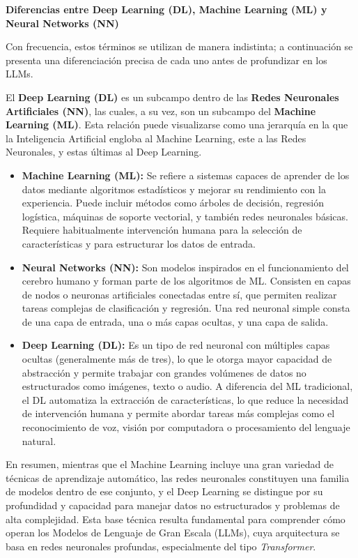 \newpage
\textbf{Diferencias entre Deep Learning (DL), Machine Learning (ML) y Neural Networks (NN)}

Con frecuencia, estos términos se utilizan de manera indistinta; a continuación se presenta una diferenciación precisa de cada uno antes de profundizar en los LLMs.

El \textbf{Deep Learning (DL)} es un subcampo dentro de las \textbf{Redes Neuronales Artificiales (NN)}, las cuales, a su vez, son un subcampo del \textbf{Machine Learning (ML)}. Esta relación puede visualizarse como una jerarquía en la que la Inteligencia Artificial engloba al Machine Learning, este a las Redes Neuronales, y estas últimas al Deep Learning.

\begin{itemize}
    \item \textbf{Machine Learning (ML):} Se refiere a sistemas capaces de aprender de los datos mediante algoritmos estadísticos y mejorar su rendimiento con la experiencia. Puede incluir métodos como árboles de decisión, regresión logística, máquinas de soporte vectorial, y también redes neuronales básicas. Requiere habitualmente intervención humana para la selección de características y para estructurar los datos de entrada.
    
    \item \textbf{Neural Networks (NN):} Son modelos inspirados en el funcionamiento del cerebro humano y forman parte de los algoritmos de ML. Consisten en capas de nodos o neuronas artificiales conectadas entre sí, que permiten realizar tareas complejas de clasificación y regresión. Una red neuronal simple consta de una capa de entrada, una o más capas ocultas, y una capa de salida.
    
    \item \textbf{Deep Learning (DL):} Es un tipo de red neuronal con múltiples capas ocultas (generalmente más de tres), lo que le otorga mayor capacidad de abstracción y permite trabajar con grandes volúmenes de datos no estructurados como imágenes, texto o audio. A diferencia del ML tradicional, el DL automatiza la extracción de características, lo que reduce la necesidad de intervención humana y permite abordar tareas más complejas como el reconocimiento de voz, visión por computadora o procesamiento del lenguaje natural.
\end{itemize}

En resumen, mientras que el Machine Learning incluye una gran variedad de técnicas de aprendizaje automático, las redes neuronales constituyen una familia de modelos dentro de ese conjunto, y el Deep Learning se distingue por su profundidad y capacidad para manejar datos no estructurados y problemas de alta complejidad. Esta base técnica resulta fundamental para comprender cómo operan los Modelos de Lenguaje de Gran Escala (LLMs), cuya arquitectura se basa en redes neuronales profundas, especialmente del tipo \textit{Transformer}.

